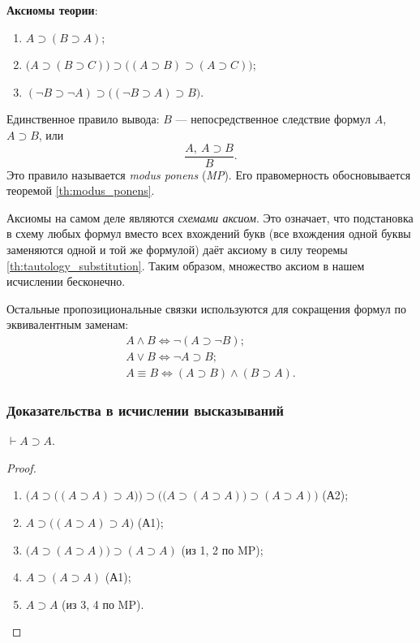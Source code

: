 \textbf{Аксиомы теории}:
\begin{enumerate}[label=(А\arabic*)]
    \item $A \supset (B \supset A)$;
    \item $\big(A \supset (B \supset C)\big) \supset \big((A \supset B) \supset (A \supset C)\big)$;
    \item $(\neg B \supset \neg A) \supset \big((\neg B \supset A) \supset B\big)$.
\end{enumerate}
Единственное правило вывода: $B$ --- непосредственное следствие формул $A$, $A \supset B$, или
\[
    \frac{A,\ A \supset B}{B}.
\]
Это правило называется \textit{modus ponens} (\textit{MP}). Его правомерность обосновывается теоремой \ref{th:modus_ponens}.
\begin{remark}
    Аксиомы на самом деле являются \textit{схемами аксиом}. Это означает, что подстановка в схему любых формул вместо всех вхождений букв (все вхождения одной буквы заменяются одной и той же формулой) даёт аксиому в силу теоремы \ref{th:tautology_substitution}. Таким образом, множество аксиом в нашем исчислении бесконечно.
\end{remark}
\begin{remark}
    Остальные пропозициональные связки используются для сокращения формул по эквивалентным заменам:
    \begin{gather*}
        A \land B \Longleftrightarrow \neg(A \supset \neg B); \\
        A \lor B \Longleftrightarrow \neg A \supset B; \\
        A \equiv B \Longleftrightarrow (A \supset B) \land (B \supset A).
    \end{gather*}
\end{remark}

\subsubsection{Доказательства в исчислении высказываний}
\begin{lemma}\label{th:a_supset_a}
    $\vdash A \supset A$.
\end{lemma}
\begin{proof}\leavevmode
    \begin{enumerate}
        \item $\Big(A \supset \big((A \supset A) \supset A\big)\Big) \supset \Big(\big(A \supset (A \supset A)\big) \supset (A \supset A)\Big)$ (А2);
        \item $A \supset \big((A \supset A) \supset A\big)$ (А1);
        \item $\big(A \supset (A \supset A)\big) \supset (A \supset A)$ (из 1, 2 по MP);
        \item $A \supset (A \supset A)$ (А1);
        \item $A \supset A$ (из 3, 4 по MP).
    \end{enumerate}
\end{proof}

